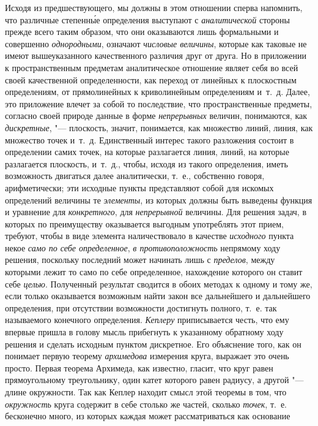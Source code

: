 Исходя из предшествующего, мы должны в этом отношении сперва напомнить, что
различные степенн\'{ы}е определения выступают с {\em аналитической} стороны
прежде всего таким образом, что они оказываются лишь формальными и совершенно
{\em однородными}, означают {\em числовые величины}, которые как таковые не
имеют вышеуказанного качественного различия друг от друга. Но в приложении к
пространственным предметам аналитическое отношение являет себя во всей своей
качественной определенности, как переход от линейных к плоскостным
определениям, от прямолинейных к криволинейным определениям и~т.~д. Далее, это
приложение влечет за собой то последствие, что пространственные предметы,
согласно своей природе данные в форме {\em непрерывных} величин, понимаются,
как {\em дискретные}, "--- плоскость, значит, понимается, как множество линий,
линия, как множество точек и~т.~д. Единственный интерес такого разложения
состоит в определении самих точек, на которые разлагается линия, линий, на
которые разлагается плоскость, и~т.~д., чтобы, исходя из такого определения,
иметь возможность двигаться далее аналитически, т.~е., собственно говоря,
арифметически; эти исходные пункты представляют собой для искомых определений
величины те {\em элементы}, из которых должны быть выведены функция и уравнение
для {\em конкретного}, для {\em непрерывной} величины. Для решения задач, в
которых по преимуществу оказывается выгодным употреблять этот прием, требуют,
чтобы в виде элемента наличествовало в качестве {\em исходного} пункта некое
{\em само по себе определенное}, {\em в противоположность} непрямому ходу
решения, поскольку последний может начинать лишь с {\em пределов}, между
которыми лежит то само по себе определенное, нахождение которого он ставит себе
{\em целью}. Полученный результат сводится в обоих методах к одному и тому же,
если только оказывается возможным найти закон все дальнейшего и дальнейшего
определения, при отсутствии возможности достигнуть полного, т.~е. так
называемого конечного определения. {\em Кеплеру} приписывается честь, что ему
впервые пришла в голову мысль прибегнуть к указанному обратному ходу решения и
сделать исходным пунктом дискретное. Его объяснение того, как он понимает
первую теорему {\em архимедова} измерения круга, выражает это очень просто.
Первая теорема Архимеда, как известно, гласит, что круг равен прямоугольному
треугольнику, один катет которого равен радиусу, а другой "--- длине
окружности. Так как Кеплер находит смысл этой теоремы в том, что
{\em окружность} круга содержит в себе столько же частей, сколько {\em точек},
т.~е. бесконечно много, из которых каждая может рассматриваться как основание
